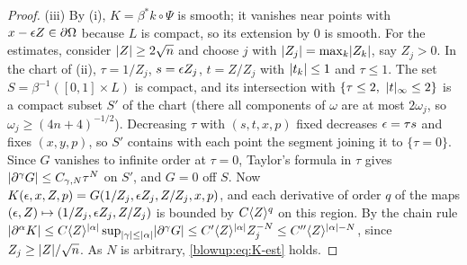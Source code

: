 \begin{proof}
(iii) By (i), $K=\beta^*k\circ\Psi$ is smooth; it vanishes near points with
$x-\epsilon Z\in\partial\Omega$ because $L$ is compact, so its extension by $0$ is smooth. For the
estimates, consider $\lvert Z\rvert\ge2\sqrt n$ and choose $j$ with $\lvert Z_j\rvert=\max_k\lvert Z_k\rvert$, say
$Z_j>0$. In the chart of (ii), $\tau=1/Z_j$, $s=\epsilon Z_j$, $t=Z/Z_j$ with $\lvert t_k\rvert\le1$
and $\tau\le1$. The set $S=\beta^{-1}([0,1]\times L)$ is compact, and its intersection with
$\{\tau\le2,\ \lvert t\rvert_\infty\le2\}$ is a compact subset $S'$ of the chart (there all
components of $\omega$ are at most $2\omega_j$, so $\omega_j\ge(4n+4)^{-1/2}$). Decreasing
$\tau$ with $(s,t,x,p)$ fixed decreases $\epsilon=\tau s$ and fixes $(x,y,p)$, so $S'$ contains
with each point the segment joining it to $\{\tau=0\}$. Since $G$ vanishes to infinite order
at $\tau=0$, Taylor's formula in $\tau$ gives $\lvert \partial^\gamma G\rvert\le C_{\gamma,N}\tau^N$ on $S'$,
and $G=0$ off $S$. Now
$K(\epsilon,x,Z,p)=G(1/Z_j,\epsilon Z_j,Z/Z_j,x,p)$, and each derivative of order $q$ of the maps
$(\epsilon,Z)\mapsto(1/Z_j,\epsilon Z_j,Z/Z_j)$ is bounded by $C\langle Z\rangle^q$ on this region. By the
chain rule $\lvert \partial^\alpha K\rvert\le C\langle Z\rangle^{\lvert \alpha\rvert}\sup_{\lvert \gamma\rvert\le\lvert \alpha\rvert}
\lvert \partial^\gamma G\rvert\le C'\langle Z\rangle^{\lvert \alpha\rvert}Z_j^{-N}\le C''\langle Z\rangle^{\lvert \alpha\rvert-N}$, since
$Z_j\ge\lvert Z\rvert/\sqrt n$. As $N$ is arbitrary, \eqref{blowup:eq:K-est} holds.
\end{proof}

